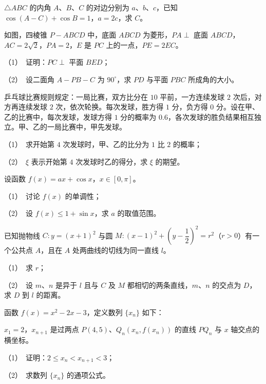 \begin{question}
$\triangle ABC$ 的内角 $A\text{、}B\text{、}C$ 的对边分别为 $a\text{、}b\text{、}c$，已知 $\cos(A-C)+\cos B=1$，$a=2c$，求 $C$。

\Needspace{0.4\textheight}
\end{question}
\begin{question}
如图，四棱锥 $P-ABCD$ 中，底面 $ABCD$ 为菱形，$PA\perp$ 底面 $ABCD$，$AC=2\sqrt2$，$PA=2$，$E$ 是 $PC$ 上的一点，$PE=2EC$。
\nopagebreak[4]
\begin{center}\end{center}
\nopagebreak[4]
（1）　证明：$PC\perp$ 平面 $BED$；

（2）　设二面角 $A-PB-C$ 为 $90^\circ$，求 $PD$ 与平面 $PBC$ 所成角的大小。

\end{question}
\begin{question}
乒乓球比赛规则规定：一局比赛，双方比分在 $10$ 平前，一方连续发球 $2$ 次后，对方再连续发球 $2$ 次，依次轮换。每次发球，胜方得 $1$ 分，负方得 $0$ 分。设在甲、乙的比赛中，每次发球，发球方得 $1$ 分的概率为 $0.6$，各次发球的胜负结果相互独立。甲、乙的一局比赛中，甲先发球。

（1）　求开始第 $4$ 次发球时，甲、乙的比分为 $1$ 比 $2$ 的概率；

（2）　$\xi$ 表示开始第 $4$ 次发球时乙的得分，求 $\xi$ 的期望。

\end{question}
\begin{question}
设函数 $f(x)=ax+\cos x$，$x\in[0,\pi]$。

（1）　讨论 $f(x)$ 的单调性；

（2）　设 $f(x)\leqslant1+\sin x$，求 $a$ 的取值范围。

\end{question}
\begin{question}
已知抛物线 $C:y=(x+1)^2$ 与圆 $M:(x-1)^2+\left(y-\dfrac12\right)^2=r^2$（$r>0$）有一个公共点 $A$，且在 $A$ 处两曲线的切线为同一直线 $l$。

（1）　求 $r$；

（2）　设 $m\text{、}n$ 是异于 $l$ 且与 $C$ 及 $M$ 都相切的两条直线，$m\text{、}n$ 的交点为 $D$，求 $D$ 到 $l$ 的距离。

\end{question}
\begin{question}
函数 $f(x)=x^2-2x-3$，定义数列 $\{x_n\}$ 如下：

$x_1=2$，$x_{n+1}$ 是过两点 $P(4,5)\text{、}Q_n(x_n,f(x_n))$ 的直线 $PQ_n$ 与 $x$ 轴交点的横坐标。

（1）　证明：$2\leqslant x_n<x_{n+1}<3$；

（2）　求数列 $\{x_n\}$ 的通项公式。

\end{question}